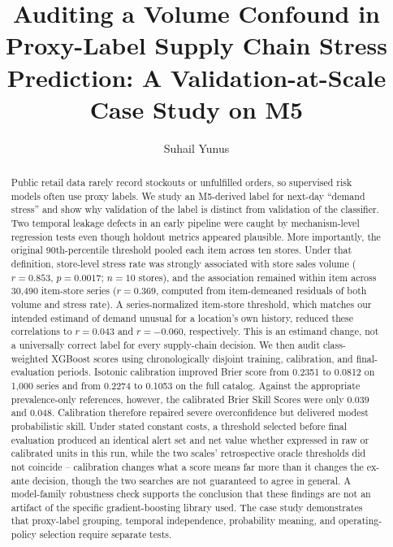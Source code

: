 \documentclass[11pt]{article}
\title{Auditing a Volume Confound in Proxy-Label Supply Chain Stress Prediction: A Validation-at-Scale Case Study on M5}
\author[1]{Suhail Yunus}
\affil[1]{Independent Researcher}
\date{}
\begin{document}
\maketitle

\begin{abstract}
Public retail data rarely record stockouts or unfulfilled orders, so supervised risk models often use proxy labels. We study an M5-derived label for next-day ``demand stress'' and show why validation of the label is distinct from validation of the classifier. Two temporal leakage defects in an early pipeline were caught by mechanism-level regression tests even though holdout metrics appeared plausible. More importantly, the original 90th-percentile threshold pooled each item across ten stores. Under that definition, store-level stress rate was strongly associated with store sales volume ($r=0.853$, $p=0.0017$; $n=10$ stores), and the association remained within item across 30{,}490 item-store series ($r=0.369$, computed from item-demeaned residuals of both volume and stress rate). A series-normalized item-store threshold, which matches our intended estimand of demand unusual for a location's own history, reduced these correlations to $r=0.043$ and $r=-0.060$, respectively. This is an estimand change, not a universally correct label for every supply-chain decision. We then audit class-weighted XGBoost scores using chronologically disjoint training, calibration, and final-evaluation periods. Isotonic calibration improved Brier score from 0.2351 to 0.0812 on 1{,}000 series and from 0.2274 to 0.1053 on the full catalog. Against the appropriate prevalence-only references, however, the calibrated Brier Skill Scores were only 0.039 and 0.048. Calibration therefore repaired severe overconfidence but delivered modest probabilistic skill. Under stated constant costs, a threshold selected before final evaluation produced an identical alert set and net value whether expressed in raw or calibrated units in this run, while the two scales' retrospective oracle thresholds did not coincide -- calibration changes what a score means far more than it changes the ex-ante decision, though the two searches are not guaranteed to agree in general. A model-family robustness check supports the conclusion that these findings are not an artifact of the specific gradient-boosting library used. The case study demonstrates that proxy-label grouping, temporal independence, probability meaning, and operating-policy selection require separate tests.
\end{abstract}
\end{document}
